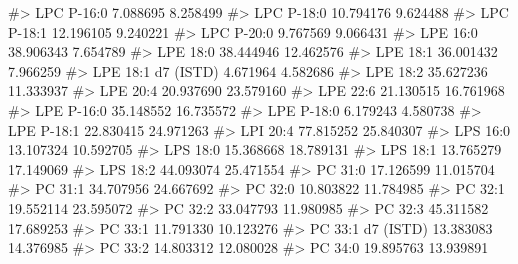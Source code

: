 \documentclass[
  letterpaper,
  DIV=11,
  numbers=noendperiod]{scrreprt}
\newenvironment{Shaded}{\begin{snugshade}}{\end{snugshade}}
\newcommand{\CommentTok}[1]{\textcolor[rgb]{0.37,0.37,0.37}{#1}}
\begin{document}
\begin{Shaded}
\begin{Highlighting}[]
\CommentTok{\#\textgreater{} LPC P{-}16:0                                 7.088695  8.258499}
\CommentTok{\#\textgreater{} LPC P{-}18:0                                10.794176  9.624488}
\CommentTok{\#\textgreater{} LPC P{-}18:1                                12.196105  9.240221}
\CommentTok{\#\textgreater{} LPC P{-}20:0                                 9.767569  9.066431}
\CommentTok{\#\textgreater{} LPE 16:0                                  38.906343  7.654789}
\CommentTok{\#\textgreater{} LPE 18:0                                  38.444946 12.462576}
\CommentTok{\#\textgreater{} LPE 18:1                                  36.001432  7.966259}
\CommentTok{\#\textgreater{} LPE 18:1 d7 (ISTD)                         4.671964  4.582686}
\CommentTok{\#\textgreater{} LPE 18:2                                  35.627236 11.333937}
\CommentTok{\#\textgreater{} LPE 20:4                                  20.937690 23.579160}
\CommentTok{\#\textgreater{} LPE 22:6                                  21.130515 16.761968}
\CommentTok{\#\textgreater{} LPE P{-}16:0                                35.148552 16.735572}
\CommentTok{\#\textgreater{} LPE P{-}18:0                                 6.179243  4.580738}
\CommentTok{\#\textgreater{} LPE P{-}18:1                                22.830415 24.971263}
\CommentTok{\#\textgreater{} LPI 20:4                                  77.815252 25.840307}
\CommentTok{\#\textgreater{} LPS 16:0                                  13.107324 10.592705}
\CommentTok{\#\textgreater{} LPS 18:0                                  15.368668 18.789131}
\CommentTok{\#\textgreater{} LPS 18:1                                  13.765279 17.149069}
\CommentTok{\#\textgreater{} LPS 18:2                                  44.093074 25.471554}
\CommentTok{\#\textgreater{} PC 31:0                                   17.126599 11.015704}
\CommentTok{\#\textgreater{} PC 31:1                                   34.707956 24.667692}
\CommentTok{\#\textgreater{} PC 32:0                                   10.803822 11.784985}
\CommentTok{\#\textgreater{} PC 32:1                                   19.552114 23.595072}
\CommentTok{\#\textgreater{} PC 32:2                                   33.047793 11.980985}
\CommentTok{\#\textgreater{} PC 32:3                                   45.311582 17.689253}
\CommentTok{\#\textgreater{} PC 33:1                                   11.791330 10.123276}
\CommentTok{\#\textgreater{} PC 33:1 d7 (ISTD)                         13.383083 14.376985}
\CommentTok{\#\textgreater{} PC 33:2                                   14.803312 12.080028}
\CommentTok{\#\textgreater{} PC 34:0                                   19.895763 13.939891}

\end{Highlighting}
\end{Shaded}
\end{document}
